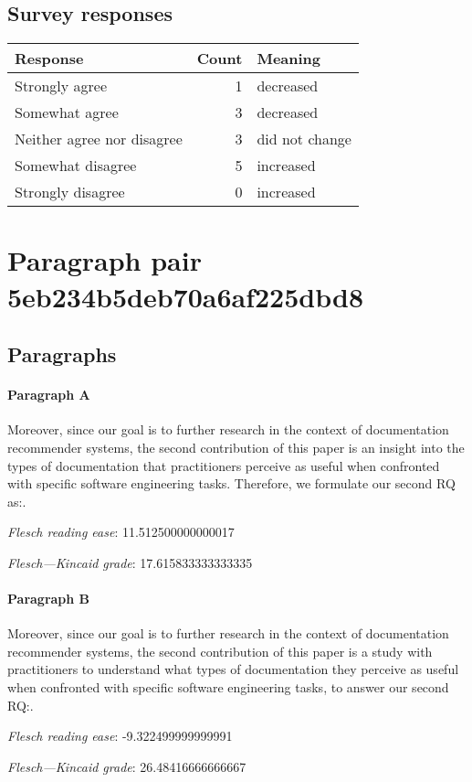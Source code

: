 \subsection{Survey responses}
\begin{tabular}{lrl}
\toprule
          \textbf{Response} &  \textbf{Count} & \textbf{Meaning} \\
\midrule
             Strongly agree &               1 &        decreased \\
             Somewhat agree &               3 &        decreased \\
 Neither agree nor disagree &               3 &   did not change \\
          Somewhat disagree &               5 &        increased \\
          Strongly disagree &               0 &        increased \\
\bottomrule
\end{tabular}

\section{Paragraph pair 5eb234b5deb70a6af225dbd8}
\subsection{Paragraphs}
\paragraph{Paragraph A}
Moreover, since our goal is to further research in the context of documentation recommender systems, the second contribution of this paper is an insight into the types of documentation that practitioners perceive as useful when confronted with specific software engineering tasks. Therefore, we formulate our second RQ as:.\par\medskip\emph{Flesch reading ease}: 11.512500000000017\par\emph{Flesch---Kincaid grade}: 17.615833333333335

\paragraph{Paragraph B}
Moreover, since our goal is to further research in the context of documentation recommender systems, the second contribution of this paper is a study with practitioners to understand what types of documentation they perceive as useful when confronted with specific software engineering tasks, to answer our second RQ:.\par\medskip\emph{Flesch reading ease}: -9.322499999999991\par\emph{Flesch---Kincaid grade}: 26.48416666666667


